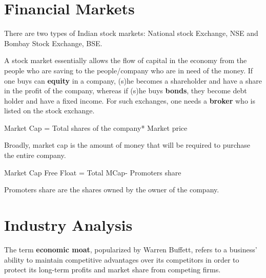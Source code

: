 \documentclass{article}
\begin{document}
\section{Financial Markets}
There are two types of Indian stock markets: National stock Exchange, NSE and Bombay Stock Exchange, BSE.\par
A stock market essentially allows the flow of capital in the economy from the people who are saving to the people/company who are in need of the money. If one buys can \textbf{equity} in a company, (s)he becomes a shareholder and have a share in the profit of the company, whereas if (s)he buys \textbf{bonds}, they become debt holder and have a fixed income. For such exchanges, one needs a \textbf{broker} who is listed on the stock exchange. 
\begin{center}
    Market Cap = Total shares of the company* Market price
\end{center}
Broadly, market cap is the amount of money that will be required to purchase the entire company.
\begin{center}
    Market Cap Free Float = Total MCap- Promoters share
\end{center}
Promoters share are the shares owned by the owner of the company. 
\section{Industry Analysis}
The term \textbf{economic moat}, popularized by Warren Buffett, refers to a business' ability to maintain competitive advantages over its competitors in order to protect its long-term profits and market share from competing firms.
\end{document}

